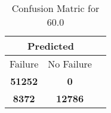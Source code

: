 \begin{table}[] 
\caption{Confusion Matric for 60.0} 
\label{Table: Prediction Accuracy-DMD60.0OnlySunEKF-combinationReflectionperfectNoFailurePrediction-Reflection} 
\centering 
\begin{tabular} 
 {@{}ccc@{}} 
\toprule 
\multicolumn{2}{c}{\textbf{Predicted}}
 \\ \midrule 
\multicolumn{1}{|c|}{Failure} & 
\multicolumn{1}{c|}{No Failure}
 \\ \midrule 
\multicolumn{1}{|c|}{\color{green}\textbf{51252}} & 
\multicolumn{1}{c|}{\color{red}\textbf{0}}
 \\ \midrule 
\multicolumn{1}{|c|}{\color{red}\textbf{8372}} & 
\multicolumn{1}{c|}{\color{green}\textbf{12786}}
 \\ \bottomrule 
\end{tabular} 
\end{table} 
